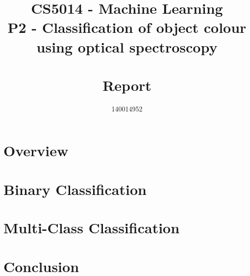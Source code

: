 \documentclass[11pt]{article}
\title{CS5014 - Machine Learning 
\\ \vspace{5mm} \Large P2 - Classification of object colour 
\\ using optical spectroscopy 
\\~\\ Report}
\author{140014952}
\begin{document}
	\maketitle

	\section{Overview}
	\section{Binary Classification}
	\section{Multi-Class Classification}
	\section{Conclusion}
	
\end{document}
